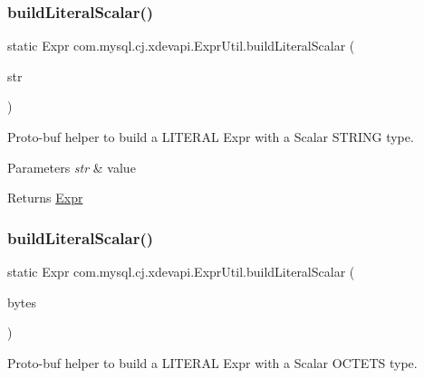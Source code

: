 \subsubsection{\texorpdfstring{build\+Literal\+Scalar()}{buildLiteralScalar()}\hspace{0.1cm}{\footnotesize\ttfamily [3/5]}}
{\footnotesize\ttfamily static Expr com.\+mysql.\+cj.\+xdevapi.\+Expr\+Util.\+build\+Literal\+Scalar (\begin{DoxyParamCaption}\item[{String}]{str }\end{DoxyParamCaption})\hspace{0.3cm}{\ttfamily [static]}}

Proto-\/buf helper to build a L\+I\+T\+E\+R\+AL Expr with a Scalar S\+T\+R\+I\+NG type.


\begin{DoxyParams}{Parameters}
{\em str} & value \\
\hline
\end{DoxyParams}
\begin{DoxyReturn}{Returns}
\mbox{\hyperlink{}{Expr}} 
\end{DoxyReturn}
\mbox{\label{classcom_1_1mysql_1_1cj_1_1xdevapi_1_1_expr_util_ad94de8c51a601e7c4415e2cc651b7187}} 
\subsubsection{\texorpdfstring{build\+Literal\+Scalar()}{buildLiteralScalar()}\hspace{0.1cm}{\footnotesize\ttfamily [4/5]}}
{\footnotesize\ttfamily static Expr com.\+mysql.\+cj.\+xdevapi.\+Expr\+Util.\+build\+Literal\+Scalar (\begin{DoxyParamCaption}\item[{byte \mbox{[}$\,$\mbox{]}}]{bytes }\end{DoxyParamCaption})\hspace{0.3cm}{\ttfamily [static]}}

Proto-\/buf helper to build a L\+I\+T\+E\+R\+AL Expr with a Scalar O\+C\+T\+E\+TS type.


